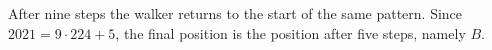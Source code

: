 After nine steps the walker returns to the start of the same pattern. Since $2021=9\cdot224+5$, the final position is the position after five steps, namely $\boxed B$.
